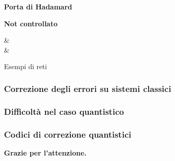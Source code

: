 \documentclass[aspectratio=169]{beamer}
\begin{document}
\begin{frame}
\begin{minipage}{0.24\textwidth}
	\end{minipage}
	\begin{minipage}{0.24\textwidth}
		\begin{center}
			\textbf{Porta di Hadamard}\\
			\vspace{10pt}
			\begin{quantikz}
			\end{quantikz}
		\end{center}
	\end{minipage}
	\begin{minipage}{0.24\textwidth}
		\begin{center}
			\textbf{Not controllato}\\
			\vspace{10pt}
			\begin{quantikz}
				\ctrl{1} & \qw \\
				\targ{} & \qw
			\end{quantikz}
		\end{center}
	\end{minipage}

\end{frame}

%
\begin{frame}{Esempi di reti}


\end{frame}


\begin{frame}
	\frametitle{Correzione degli errori su sistemi classici}

\end{frame}

\begin{frame}
	\frametitle{Difficoltà nel caso quantistico}
\end{frame}

\begin{frame}
	\frametitle{Codici di correzione quantistici}
\end{frame}

\begin{frame}
	\begin{center}
		\textbf{\LARGE Grazie per l'attenzione.}
	\end{center}
\end{frame}
\end{document}
